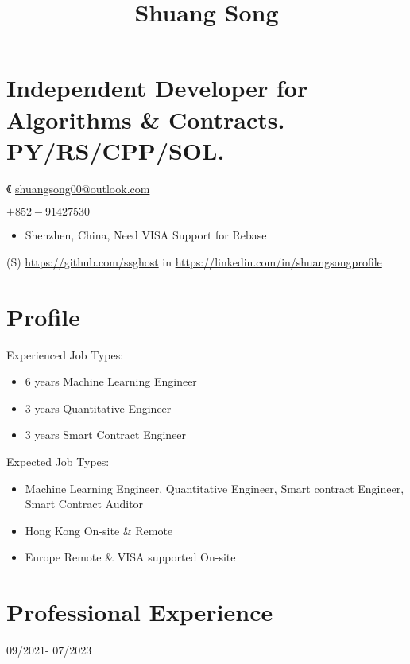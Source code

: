 \documentclass[10pt]{article}
\title{Shuang Song }
\author{}
\date{}
\begin{document}
\maketitle
\section*{Independent Developer for Algorithms \& Contracts. PY/RS/CPP/SOL.}
《 \href{mailto:shuangsong00@outlook.com}{shuangsong00@outlook.com}

$+852-91427530$

\begin{itemize}
  \item Shenzhen, China, Need VISA Support for Rebase
\end{itemize}

(S) \href{https://github.com/ssghost}{https://github.com/ssghost} in \href{https://linkedin.com/in/shuangsongprofile}{https://linkedin.com/in/shuangsongprofile}

\section*{Profile}
Experienced Job Types:

\begin{itemize}
  \item 6 years Machine Learning Engineer

  \item 3 years Quantitative Engineer

  \item 3 years Smart Contract Engineer

\end{itemize}

Expected Job Types:

\begin{itemize}
  \item Machine Learning Engineer, Quantitative Engineer, Smart contract Engineer, Smart Contract Auditor

  \item Hong Kong On-site \& Remote

  \item Europe Remote \& VISA supported On-site

\end{itemize}

\section*{Professional Experience}
09/2021- 07/2023
\end{document}
